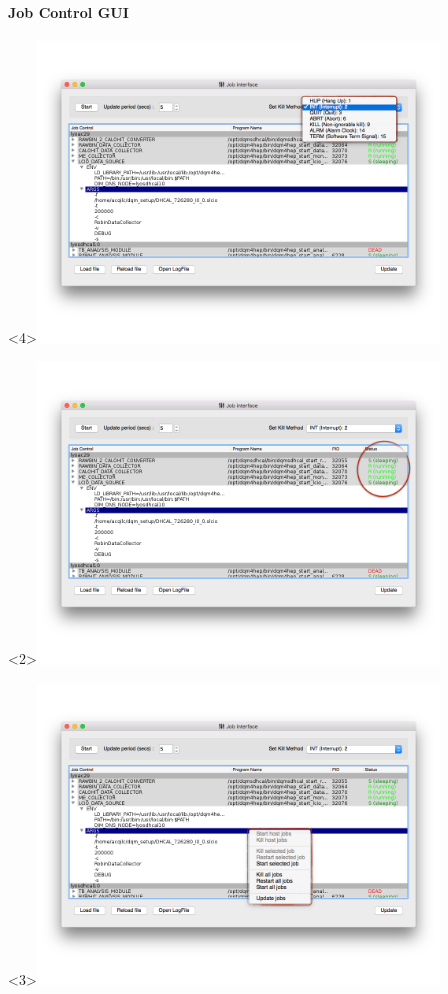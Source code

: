 \documentclass[8pt]{beamer}
\begin{document}
       
  \begin{frame}
    \frametitle{\secname}
    \framesubtitle{ Job Control GUI }
      \begin{overlayarea}{\textwidth}{\textheight}
      	\begin{center}
        		\begin{onlyenv}<4>\includegraphics[width=0.8\textwidth]{figs/JobInterface/JobInterface_KillSwitch.png}\end{onlyenv}
       		\begin{onlyenv}\includegraphics[width=0.8\textwidth]{figs/JobInterface/JobInterface_LiveStatus.png}\end{onlyenv}
        		\begin{onlyenv}<3>\includegraphics[width=0.8\textwidth]{figs/JobInterface/JobInterface_Module.png}\end{onlyenv}

\end{center}
\end{overlayarea}
\end{frame}
\end{document}
